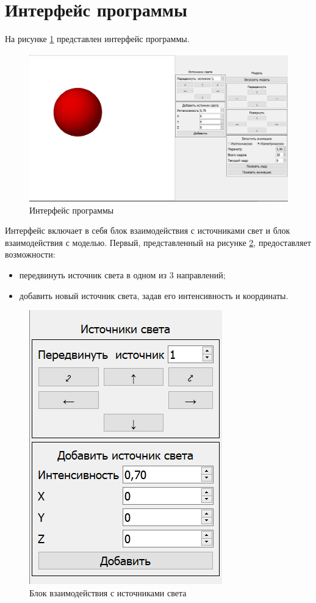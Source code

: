 \section{Интерфейс программы}
На рисунке \ref{fig:wholeinterface} представлен интерфейс программы.
\begin{figure}[H]
	\centering
	\includegraphics[width=0.9\linewidth]{images/whole_interface}
	\caption{Интерфейс программы}
	\label{fig:wholeinterface}
\end{figure}
Интерфейс включает в себя блок взаимодействия с источниками свет и блок взаимодействия с моделью. Первый, представленный на рисунке \ref{fig:lights}, предоставляет возможности:
\begin{itemize}
	\item передвинуть источник света в одном из 3 направлений;
	\item добавить новый источник света, задав его интенсивность и координаты.
\end{itemize}
\begin{figure}[H]
	\centering
	\includegraphics[width=0.4\linewidth]{images/lights}
	\caption{Блок взаимодействия с источниками света}
	\label{fig:lights}
\end{figure}

